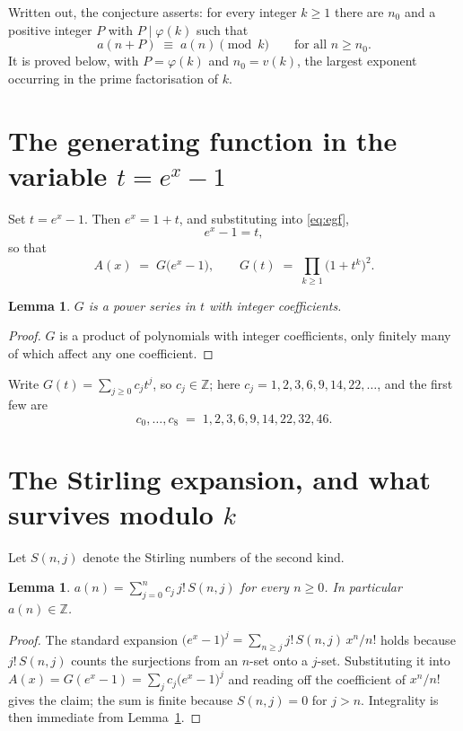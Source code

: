 \documentclass[11pt,a4paper]{article}
\theoremstyle{plain}
\newtheorem{lemma}[theorem]{Lemma}
\theoremstyle{definition}
\begin{document}
Written out, the conjecture asserts: for every integer $k\ge 1$ there are $n_0$ and a
positive integer $P$ with $P\mid\varphi(k)$ such that
\begin{equation}\label{eq:conj}
a(n+P)\;\equiv\;a(n)\pmod{k}\qquad\text{for all } n\ge n_0 .
\end{equation}
It is proved below, with $P=\varphi(k)$ and $n_0=v(k)$, the largest exponent occurring in
the prime factorisation of $k$.

\section{The generating function in the variable $t=e^{x}-1$}

Set $t=e^{x}-1$. Then $e^{x}=1+t$, and substituting into \eqref{eq:egf},
\[
e^{x}-1=t,
\]
so that
\begin{equation}\label{eq:G}
A(x)\;=\;G\bigl(e^{x}-1\bigr),\qquad
G(t)\;=\;\prod_{k\ge 1}\bigl(1+t^{k}\bigr)^{2}.
\end{equation}

\begin{lemma}\label{lem:int}
$G$ is a power series in $t$ with integer coefficients.
\end{lemma}

\begin{proof}
$G$ is a product of polynomials with integer coefficients, only finitely many of which affect any one coefficient.
\end{proof}

Write $G(t)=\sum_{j\ge0}c_j t^{j}$, so $c_j\in\mathbb{Z}$; here $c_j = 1, 2, 3, 6, 9, 14, 22, \dots$, and the
first few are
\[
c_0,\dots,c_8 \;=\; 1, 2, 3, 6, 9, 14, 22, 32, 46.
\]

\section{The Stirling expansion, and what survives modulo $k$}

Let $S(n,j)$ denote the Stirling numbers of the second kind.

\begin{lemma}\label{lem:stir}
$a(n)=\sum_{j=0}^{n} c_j\, j!\, S(n,j)$ for every $n\ge 0$. In particular $a(n)\in\mathbb{Z}$.
\end{lemma}

\begin{proof}
The standard expansion $\bigl(e^{x}-1\bigr)^{j}
=\sum_{n\ge j} j!\,S(n,j)\,x^{n}/n!$ holds because $j!\,S(n,j)$ counts the surjections
from an $n$-set onto a $j$-set. Substituting it into
$A(x)=G(e^{x}-1)=\sum_j c_j\bigl(e^{x}-1\bigr)^{j}$ and reading off the coefficient of
$x^{n}/n!$ gives the claim; the sum is finite because $S(n,j)=0$ for $j>n$. Integrality is
then immediate from Lemma~\ref{lem:int}.
\end{proof}
\end{document}
